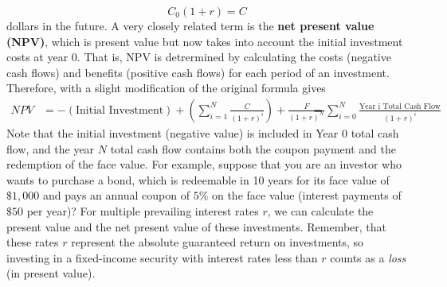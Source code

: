 \documentclass{article}
\begin{document}
    \begin{equation}
      C_0 (1+r) = C
    \end{equation}
    dollars in the future. A very closely related term is the \textbf{net present value (NPV)}, which is present value but now takes into account the initial investment costs at year $0$. That is, NPV is detrermined by calculating the costs (negative cash flows) and benefits (positive cash flows) for each period of an investment. Therefore, with a slight modification of the original formula gives
    \begin{align*}
      NPV & = -(\text{Initial Investment}) + \left( \sum_{i=1}^N \frac{C}{(1+r)^i} \right) + \frac{F}{(1+r)^N} \
      & = \sum_{i=0}^N \frac{\text{Year i Total Cash Flow}}{(1 + r)^i}
    \end{align*}
    Note that the initial investment (negative value) is included in Year $0$ total cash flow, and the year $N$ total cash flow contains both the coupon payment and the redemption of the face value.
    For example, suppose that you are an investor who wants to purchase a bond, which is redeemable in 10 years for its face value of $\$1,000$ and pays an annual coupon of $5\%$ on the face value (interest payments of $\$50$ per year)? For multiple prevailing interest rates $r$, we can calculate the present value and the net present value of these investments. Remember, that these rates $r$ represent the absolute guaranteed return on investments, so investing in a fixed-income security with interest rates less than $r$ counts as a \textit{loss} (in present value).
\end{document}
